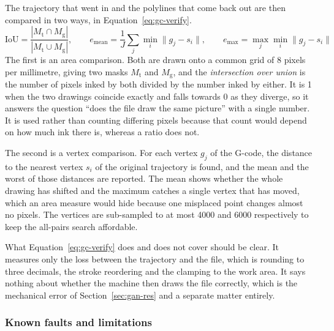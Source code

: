 The trajectory that went in and the polylines that come back out are then compared in two ways, in Equation~\ref{eq:gc-verify}.
\begin{equation}
\mathrm{IoU}=\frac{|M_{\mathrm t}\cap M_{\mathrm g}|}{|M_{\mathrm t}\cup M_{\mathrm g}|},\qquad e_{\mathrm{mean}}=\frac{1}{J}\sum_j\min_i\lVert g_j-s_i\rVert,\qquad e_{\max}=\max_j\min_i\lVert g_j-s_i\rVert
\label{eq:gc-verify}
\end{equation}
The first is an area comparison. Both are drawn onto a common grid of 8 pixels per millimetre, giving two masks $M_{\mathrm t}$ and $M_{\mathrm g}$, and the \emph{intersection over union} is the number of pixels inked by both divided by the number inked by either. It is 1 when the two drawings coincide exactly and falls towards 0 as they diverge, so it answers the question ``does the file draw the same picture'' with a single number. It is used rather than counting differing pixels because that count would depend on how much ink there is, whereas a ratio does not.

The second is a vertex comparison. For each vertex $g_j$ of the G-code, the distance to the nearest vertex $s_i$ of the original trajectory is found, and the mean and the worst of those distances are reported. The mean shows whether the whole drawing has shifted and the maximum catches a single vertex that has moved, which an area measure would hide because one misplaced point changes almost no pixels. The vertices are sub-sampled to at most 4000 and 6000 respectively to keep the all-pairs search affordable.

What Equation~\ref{eq:gc-verify} does and does not cover should be clear. It measures only the loss between the trajectory and the file, which is rounding to three decimals, the stroke reordering and the clamping to the work area. It says nothing about whether the machine then draws the file correctly, which is the mechanical error of Section~\ref{sec:gan-res} and a separate matter entirely.

\subsubsection{Known faults and limitations}
\label{sec:gc-faults}

